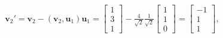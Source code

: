 \documentclass[dvipdfmx]{jsarticle}
\theoremstyle{definition}
\begin{document}
\begin{figure}[H]
    \begin{minipage}{0.60\textwidth}
        \begin{leftbar}
            \begin{align*}
                \bm{v}_2'
                = \bm{v}_2 - (\bm{v}_2, \bm{u}_1) \bm{u}_1
                = \begin{bmatrix} 1 \\ 3 \\ 1 \end{bmatrix}
                    - \frac{4}{\sqrt{2}} \frac{1}{\sqrt{2}} \begin{bmatrix} 1 \\ 1 \\ 0 \end{bmatrix}
                = \begin{bmatrix} -1 \\ 1 \\ 1 \end{bmatrix} ,
            \end{align*}
        \end{leftbar}


\end{minipage}
\end{figure}
\end{document}
